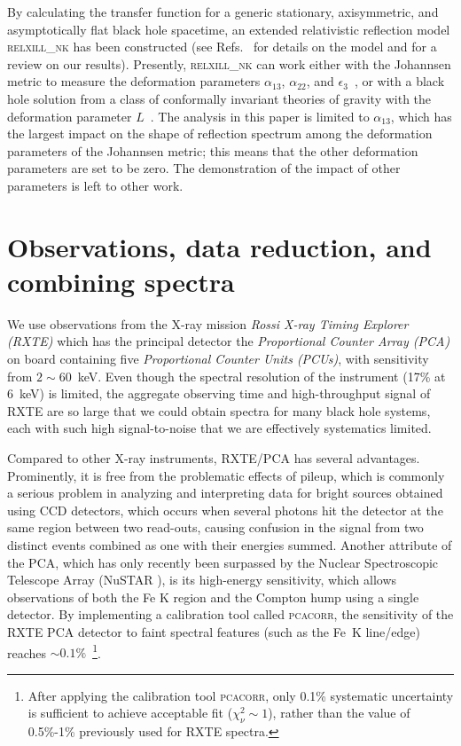 \documentclass[11pt,a4paper,pdftex]{article}
\begin{document}
By calculating the transfer function for a generic stationary, axisymmetric, and asymptotically flat black hole spacetime, an extended relativistic reflection model \textsc{relxill\_nk} has been constructed (see Refs.~\cite{bambi2016,abdikamalov2019} for details on the model and \cite{review-cp} for a review on our results). Presently, \textsc{relxill\_nk} can work either with the Johannsen metric to measure the deformation parameters $\alpha_{13}$, $\alpha_{22}$, and $\epsilon_{3}$~\cite{bambi2016,abdikamalov2019}, or with a black hole solution from a class of conformally invariant theories of gravity with the deformation parameter $L$~\cite{conf1,conf2}. The analysis in this paper is limited to $\alpha_{13}$, which has the largest impact on the shape of reflection spectrum among the deformation parameters of the Johannsen metric; this means that the other deformation parameters are set to be zero. The demonstration of the impact of other parameters is left to other work.






\section{Observations, data reduction, and combining spectra} \label{obs}

We use observations from the X-ray mission \textit{Rossi X-ray Timing Explorer (RXTE)} which has the principal detector the \textit{Proportional Counter Array (PCA)} on board containing five \textit{Proportional Counter Units (PCUs)}, with sensitivity from $2\sim60$~keV. Even though the spectral resolution of the instrument (17\% at 6~keV) is limited, the aggregate observing time and high-throughput signal of RXTE are so large that we could obtain spectra for many black hole systems, each with such high signal-to-noise that we are effectively systematics limited.


Compared to other X-ray instruments, RXTE/PCA has several advantages. Prominently, it is free from the problematic effects of pileup, which is commonly a serious problem in analyzing and interpreting data for bright sources obtained using CCD detectors, which occurs when several photons hit the detector at the same region between two read-outs, causing confusion in the signal from two distinct events combined as one with their energies summed. Another attribute of the PCA, which has only recently been surpassed by the Nuclear Spectroscopic Telescope Array (NuSTAR \cite{nustar}), is its high-energy sensitivity, which allows observations of both the Fe K region and the Compton hump using a single detector. By implementing a calibration tool called \textsc{pcacorr}, the sensitivity of the RXTE PCA detector to faint spectral features (such as the Fe~K line/edge) reaches $\sim0.1\%$~\cite{garcia2014_pcacorr}\footnote{After applying the calibration tool \textsc{pcacorr}, only 0.1\% systematic uncertainty is sufficient to achieve acceptable fit ($\chi^2_\nu \sim 1$), rather than the value of 0.5\%-1\% previously used for RXTE spectra.}.  
\end{document}
